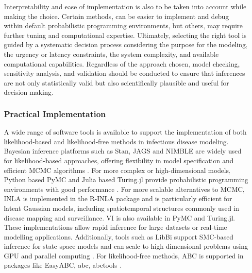 \documentclass{article}
\begin{document}
Interpretability and ease of implementation is also to be taken into account while making the choice. Certain methods, can be easier to implement and debug within default probabilistic programming environments, but others, may require further tuning and computational expertise. Ultimately, selecting the right tool is guided by a systematic decision process considering the purpose for the modeling, the urgency or latency constraints, the system complexity, and available computational capabilities. Regardless of the approach chosen, model checking, sensitivity analysis, and validation should be conducted to ensure that inferences are not only statistically valid but also scientifically plausible and useful for decision making.



\subsubsection{Practical Implementation}

A wide range of software tools is available to support the implementation of both likelihood-based and likelihood-free methods in infectious disease modeling. Bayesian inference platforms such as Stan, JAGS and NIMBLE are widely used for likelihood-based approaches, offering flexibility in model specification and efficient MCMC algorithms \citep{carpenter2017stan,abril2023pymc}. For more complex or high-dimensional models, Python based PyMC and Julia based Turing.jl provide probabilistic programming environments with good performance \citep{abril2023pymc,ge2018turing,fjelde2025turing}. For more scalable alternatives to MCMC, INLA is implemented in the R-INLA package \citep{martins2013bayesian} and is particularly efficient for latent Gaussian models, including spatiotemporal structures commonly used in disease mapping and surveillance. VI is also available in PyMC and Turing.jl. These implementations allow rapid inference for large datasets or real-time modelling applications.  Additionally, tools such as LibBi support SMC-based inference for state-space models and can scale to high-dimensional problems using GPU and parallel computing \citep{murray2015bayesian}. For likelihood-free methods, ABC is supported in packages like EasyABC, abc, abctools \citep{jabot2013easy,csillery2012abc,nunes2015abctools}.
\end{document}
